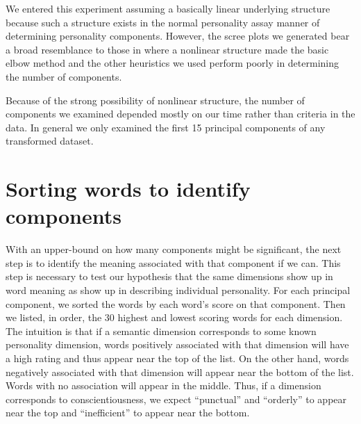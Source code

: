 \documentclass[eric_thesis.tex]{subfiles}
\begin{document}
We entered this experiment assuming a basically 
linear underlying structure because such a structure exists in the normal 
personality assay manner of determining personality components. However, the 
scree plots we generated bear a broad resemblance to those in  where a nonlinear structure made the basic 
elbow method and the other heuristics we used perform poorly in determining the 
number of components.

Because of the strong possibility of nonlinear structure, the number of 
components we examined depended mostly on our time rather than criteria in the 
data. In general we only examined the first 15 principal components of any
transformed dataset.

\section{Sorting words to identify components}

With an upper-bound on how many components might be significant, the next 
step is to identify the meaning associated with that component if we can. This 
step is necessary to test our hypothesis that the same dimensions show up in 
word meaning as show up in describing individual personality. For each 
principal 
component, we sorted the words by each word's score on that component. Then we 
listed, in order, the 30 highest and lowest scoring words for each dimension. 
The intuition is that if a semantic dimension corresponds to some known 
personality dimension, words positively associated with that dimension will 
have 
a high rating and thus appear near the top of the list. On the other hand, 
words 
negatively associated with that dimension will appear near the bottom of the 
list. Words with no association will appear in the middle. Thus, if a dimension 
corresponds to conscientiousness, we expect ``punctual'' and ``orderly'' to 
appear near the top and ``inefficient'' to appear near the bottom.
\end{document}
